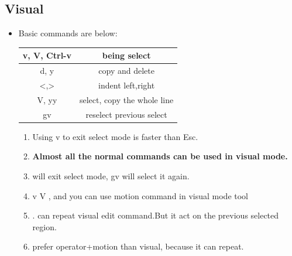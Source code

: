 \documentclass[a4paper,12pt,twoside]{book}
\begin{document}
\subsection{Visual}
\begin{itemize} 
		\item Basic commands are below:
    \begin{center}
        \begin{tabular}{c|c}
				\hline
		v, V, Ctrl-v  & being select\\

		\hline 
		d, y & copy and delete\\

		\hline
		<,> & indent left,right\\

		\hline
		V, yy & select, copy the whole line  \\

		\hline
		gv & reselect previous select \\

\hline 		
			\end{tabular}
	\end{center}

	\begin{enumerate}
			\item Using v to exit select mode is faster than Esc. 

			\item \textbf{Almost all the normal commands can be used in visual mode.}
					
			\item <,> will exit select mode, gv will select it again. 

			\item v V , and you can use motion command in visual mode tool
					
			\item . can repeat visual edit command.But it act on the previous selected region.  
					
			\item prefer operator+motion than visual, because it can repeat.
	\end{enumerate}					
	\end{itemize}
\end{document}
